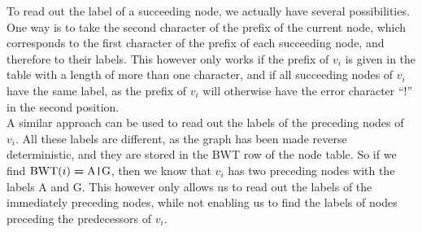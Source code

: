 \documentclass[a4paper,12pt,twoside,BCOR=10mm]{scrbook}
\def\pipe{\texttt{|}}
\begin{document}
To read out the label of a succeeding node, we actually have several possibilities. 
One way is to take the second character of the prefix of the current node, 
which corresponds to the first character of the prefix of each succeeding node, 
and therefore to their labels. This however only works if the prefix of $ v_i $ is 
given in the table with a length of more than one character, and if all succeeding nodes 
of $ v_i $ have the same label, as the prefix of $ v_i $ will otherwise have the 
error character “!” in the second position. \\
A similar approach can be used to read out the labels of the preceding nodes of $ v_i $. 
All these labels are different, as the graph has been made reverse deterministic, 
and they are stored in the BWT row of the node table. So if we find $ \textrm{BWT} ( i ) \boldsymbol{=} \textrm{A{\pipe}G} $, 
then we know that $ v_i $ has two preceding nodes with the labels A and G. 
This however only allows us to read out the labels of the immediately preceding nodes, 
while not enabling us to find the labels of nodes preceding the predecessors of $ v_i $.
\end{document}
